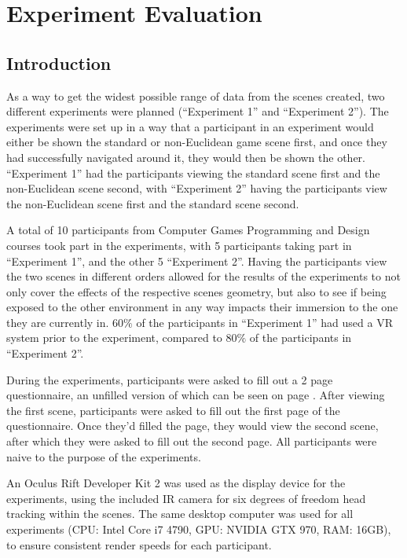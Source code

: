 \chapter[Experiment]{Experiment Evaluation}
\label{exp}

	\section{Introduction}
	\label{exp:intro}

		As a way to get the widest possible range of data from the scenes created, two different experiments were planned (\enquote{Experiment 1} and \enquote{Experiment 2}).
		The experiments were set up in a way that a participant in an experiment would either be shown the standard or non-Euclidean game scene first, and once they had successfully navigated around it, they would then be shown the other.
		\enquote{Experiment 1} had the participants viewing the standard scene first and the non-Euclidean scene second, with \enquote{Experiment 2} having the participants view the non-Euclidean scene first and the standard scene second.

		A total of 10 participants from Computer Games Programming and Design courses took part in the experiments, with 5 participants taking part in \enquote{Experiment 1}, and the other 5 \enquote{Experiment 2}.
		Having the participants view the two scenes in different orders allowed for the results of the experiments to not only cover the effects of the respective scenes geometry, but also to see if being exposed to the other environment in any way impacts their immersion to the one they are currently in. %
		$60\%$ of the participants in \enquote{Experiment 1} had used a VR system prior to the experiment, compared to $80\%$ of the participants in \enquote{Experiment 2}.

		During the experiments, participants were asked to fill out a 2 page questionnaire, an unfilled version of which can be seen on page \pageref{appendix:question}.
		After viewing the first scene, participants were asked to fill out the first page of the questionnaire. Once they'd filled the page, they would view the second scene, after which they were asked to fill out the second page. %
		All participants were naive to the purpose of the experiments.

		An Oculus Rift Developer Kit 2 was used as the display device for the experiments, using the included IR camera for six degrees of freedom head tracking within the scenes.
		The same desktop computer was used for all experiments (CPU: Intel Core i7 4790, GPU: NVIDIA GTX 970, RAM: 16GB), to ensure consistent render speeds for each participant.

